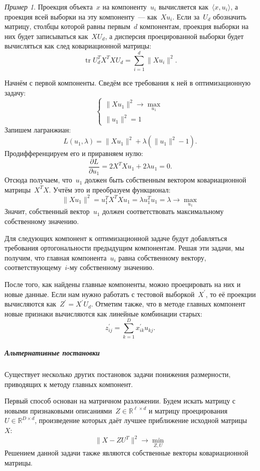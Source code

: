 \documentclass[a4paper, 12pt]{article}
\newcommand{\Tr}{\mathop{\mathrm{tr}}}
\theoremstyle{plain} %
\theoremstyle{definition} %
\theoremstyle{remark} %
\newtheorem{example}{Пример}
\begin{document}
\begin{example}
Проекция объекта~$x$ на компоненту~$u_i$ вычисляется как~$\langle x, u_i \rangle$,
а проекция всей выборки на эту компоненту~--- как~$X u_i$.
Если за~$U_d$ обозначить матрицу, столбцы которой равны первым~$d$ компонентам,
проекция выборки на них будет записываться как~$X U_d$,
а дисперсия проецированной выборки будет вычисляться как след ковариационной матрицы:
\[
    \Tr U_d^T X^T X U_d
    =
    \sum_{i = 1}^{d} \|X u_i\|^2.
\]

Начнём с первой компоненты.
Сведём все требования к ней в оптимизационную задачу:
\[
    \begin{cases}
        \| X u_1 \|^2 \to \max_{u_1} \\
        \|u_1\|^2 = 1
    \end{cases}
\]
Запишем лагранжиан:
\[
    L(u_1, \lambda)
    =
    \| X u_1 \|^2 + \lambda (\|u_1\|^2 - 1).
\]
Продифференцируем его и приравняем нулю:
\[
    \frac{\partial L}{\partial u_1}
    =
    2 X^T Xu_1 + 2 \lambda u_1
    =
    0.
\]
Отсюда получаем, что~$u_1$ должен быть собственным вектором ковариационной матрицы~$X^T X$.
Учтём это и преобразуем функционал:
\[
    \| X u_1 \|^2
    =
    u_1^T X^T X u_1
    =
    \lambda u_1^T u_1
    =
    \lambda
    \to
    \max_{u_1}
\]
Значит, собственный вектор~$u_1$ должен соответствовать максимальному
собственному значению.

Для следующих компонент к оптимизационной задаче будут добавляться требования
ортогональности предыдущим компонентам.
Решая эти задачи, мы получим, что главная компонента~$u_i$
равна собственному вектору, соответствующему~$i$-му собственному значению.

После того, как найдены главные компоненты, можно проецировать на них и новые данные.
Если нам нужно работать с тестовой выборкой~$X^\prime$, то её проекции вычисляются как~$Z^\prime = X^\prime U_d$.
Отметим также, что в методе главных компонент новые признаки вычисляются как линейные комбинации старых:
\[
    z^{\prime}_{ij}
    =
    \sum_{k = 1}^{D}
    x^{\prime}_{ik} u_{kj}.
\]

\subparagraph{Альтернативные постановки}

Существует несколько других постановок задачи понижения размерности,
приводящих к методу главных компонент.

Первый способ основан на матричном разложении.
Будем искать матрицу с новыми признаковыми описаниями~$Z \in \mathbb{R}^{\ell \times d}$
и матрицу проецирования~$U \in \mathbb{R}^{D \times d}$,
произведение которых даёт лучшее приближение исходной матрицы~$X$:
\[
    \| X - Z U^T \|^2
    \to
    \min_{Z, U}
\]
Решением данной задачи также являются собственные векторы ковариационной матрицы.


\end{example}
\end{document}
